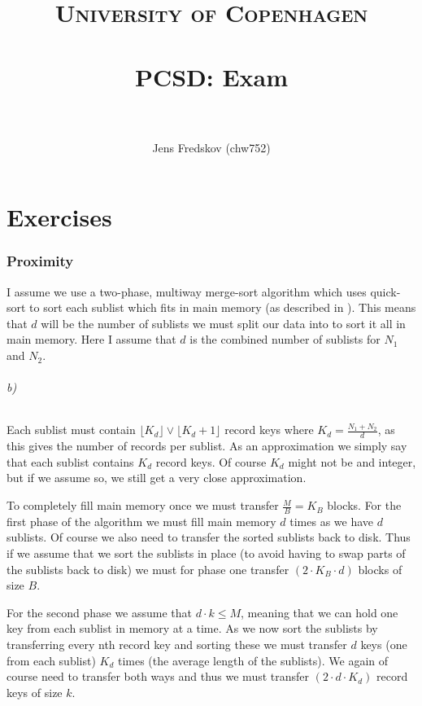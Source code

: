 \documentclass[a4paper, 11pt]{article}
\title{ 
\normalfont \normalsize 
\textsc{University of Copenhagen} \\ [25pt]
\horrule{0.5pt} \\[0.4cm]
\huge PCSD: Exam \\
\horrule{2pt} \\[0.5cm]
}
\author{Jens Fredskov (chw752)}
\begin{document}
\maketitle

\newpage
\part{Exercises} %
\label{prt:exercises_}

\section{Proximity} %
\label{sec:proximity}

I assume we use a two-phase, multiway merge-sort algorithm which uses quick-sort to sort each sublist which fits in main memory (as described in \cite{chap10}). This means that $d$ will be the number of sublists we must split our data into to sort it all in main memory. Here I assume that $d$ is the combined number of sublists for $N_1$ and $N_2$.



\paragraph{b)} %

Each sublist must contain $\lfloor K_d \rfloor \vee \lfloor K_d + 1 \rfloor$ record keys where $K_d = \frac{N_1 + N_2}{d}$, as this gives the number of records per sublist. As an approximation we simply say that each sublist contains $K_d$ record keys. Of course $K_d$ might not be and integer, but if we assume so, we still get a very close approximation.

To completely fill main memory once we must transfer $\frac{M}{B} = K_B$ blocks. For the first phase of the algorithm we must fill main memory $d$ times as we have $d$ sublists. Of course we also need to transfer the sorted sublists back to disk. Thus if we assume that we sort the sublists in place (to avoid having to swap parts of the sublists back to disk) we must for phase one transfer $(2 \cdot K_B \cdot d)$ blocks of size $B$.

For the second phase we assume that $d \cdot k \le M$, meaning that we can hold one key from each sublist in memory at a time. As we now sort the sublists by transferring every nth record key and sorting these we must transfer $d$ keys (one from each sublist) $K_d$ times (the average length of the sublists). We again of course need to transfer both ways and thus we must transfer $(2 \cdot d \cdot K_d)$ record keys of size $k$.
\end{document}
